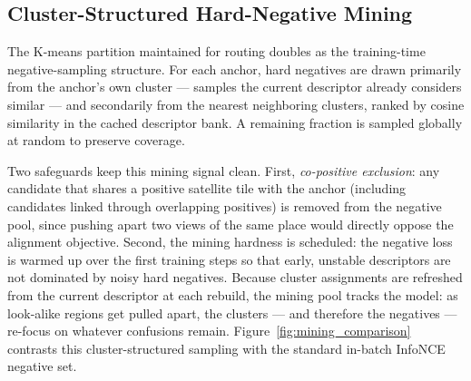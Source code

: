 \documentclass[conference]{IEEEtran}
\begin{document}
\subsection{Cluster-Structured Hard-Negative Mining}
\label{sec:hard_mining}
The K-means partition maintained for routing doubles as the training-time
negative-sampling structure. For each anchor, hard negatives are drawn
primarily from the anchor's own cluster — samples the current descriptor
already considers similar — and secondarily from the nearest neighboring
clusters, ranked by cosine similarity in the cached descriptor bank. A
remaining fraction is sampled globally at random to preserve coverage.

Two safeguards keep this mining signal clean. First, \emph{co-positive
exclusion}: any candidate that shares a positive satellite tile with the
anchor (including candidates linked through overlapping positives) is removed
from the negative pool, since pushing apart two views of the same place would
directly oppose the alignment objective. Second, the mining hardness is
scheduled: the negative loss is warmed up over the first training steps so
that early, unstable descriptors are not dominated by noisy hard negatives.
Because cluster assignments are refreshed from the current descriptor at each
rebuild, the mining pool tracks the model: as look-alike regions get pulled
apart, the clusters — and therefore the negatives — re-focus on whatever
confusions remain. Figure~\ref{fig:mining_comparison} contrasts this
cluster-structured sampling with the standard in-batch InfoNCE negative set.
\end{document}
